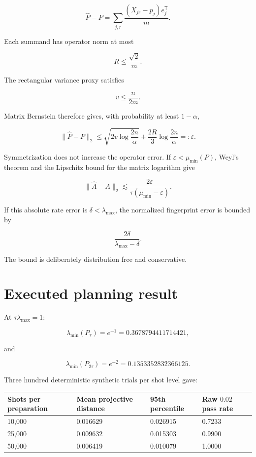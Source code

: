 \documentclass[11pt,a4paper,openany]{report}
\begin{document}
\[
\widehat P-P
=
\sum_{j,r}
\frac{(X_{jr}-p_j)e_j^\mathsf T}{m}.
\]

Each summand has operator norm at most

\[
R\leq\frac{\sqrt2}{m}.
\]

The rectangular variance proxy satisfies

\[
v\leq\frac{n}{2m}.
\]

Matrix Bernstein therefore gives, with probability at least \(1-\alpha\),

\[
\|\widehat P-P\|_2
\leq
\sqrt{2v\log\frac{2n}{\alpha}}
+
\frac{2R}{3}\log\frac{2n}{\alpha}
=:\varepsilon.
\]

Symmetrization does not increase the operator error. If \(\varepsilon<\mu_{\min}(P)\), Weyl's theorem and the Lipschitz bound for the matrix logarithm give

\[
\|\widehat A-A\|_2
\lesssim
\frac{2\varepsilon}
{\tau(\mu_{\min}-\varepsilon)}.
\]

If this absolute rate error is \(\delta<\lambda_{\max}\), the normalized fingerprint error is bounded by

\[
\frac{2\delta}{\lambda_{\max}-\delta}.
\]

The bound is deliberately distribution free and conservative.

\section{Executed planning result}

At \(\tau\lambda_{\max}=1\):

\[
\lambda_{\min}(P_\tau)=e^{-1}=0.3678794411714421,
\]

and

\[
\lambda_{\min}(P_{2\tau})=e^{-2}=0.1353352832366125.
\]

Three hundred deterministic synthetic trials per shot level gave:

\begin{center}
\begingroup\small
\setlength{\tabcolsep}{3.5pt}
\renewcommand{\arraystretch}{1.16}
\begin{longtable}{@{}p{}p{}p{}p{}@{}}
\toprule
\textbf{Shots per preparation} & \textbf{Mean projective distance} & \textbf{95th percentile} & \textbf{Raw \(0.02\) pass rate} \\
\midrule
\endhead
10,000 & 0.016629 & 0.026915 & 0.7233 \\
25,000 & 0.009632 & 0.015303 & 0.9900 \\
50,000 & 0.006419 & 0.010079 & 1.0000 \\
\bottomrule
\end{longtable}
\endgroup
\end{center}
\end{document}
